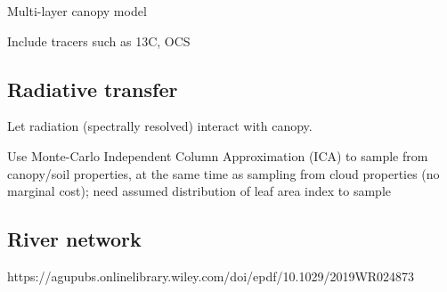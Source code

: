 \documentclass{article}
\begin{document}
Multi-layer canopy model

Include tracers such as 13C, OCS

\subsection{Radiative transfer}

Let radiation (spectrally resolved) interact with canopy.

Use Monte-Carlo Independent Column Approximation (ICA) to sample from canopy/soil properties, at the same time as sampling from cloud properties (no marginal cost); need assumed distribution of leaf area index to sample

\subsection{River network}
https://agupubs.onlinelibrary.wiley.com/doi/epdf/10.1029/2019WR024873



\end{document}
